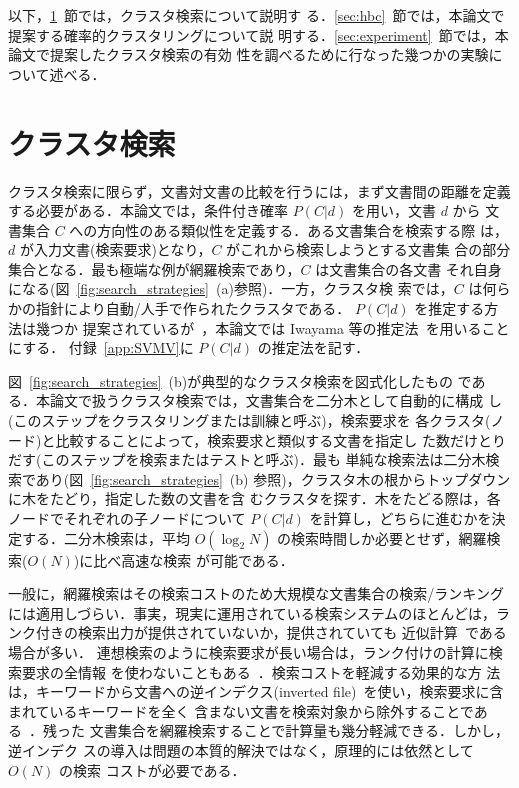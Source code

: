 以下，\ref{sec:cluster_based_search}~節では，クラスタ検索について説明す
る．\ref{sec:hbc}~節では，本論文で提案する確率的クラスタリングについて説
明する．\ref{sec:experiment}~節では，本論文で提案したクラスタ検索の有効
性を調べるために行なった幾つかの実験について述べる．

\section{クラスタ検索}
\label{sec:cluster_based_search}

クラスタ検索に限らず，文書対文書の比較を行うには，まず文書間の距離を定義
する必要がある．本論文では，条件付き確率 $P(C|d)$ を用い，文書 $d$ から
文書集合 $C$ への方向性のある類似性を定義する．ある文書集合を検索する際
は，$d$ が入力文書(検索要求)となり，$C$ がこれから検索しようとする文書集
合の部分集合となる．最も極端な例が網羅検索であり，$C$ は文書集合の各文書
それ自身になる(図~\ref{fig:search_strategies}~(a)参照)．一方，クラスタ検
索では，$C$ は何らかの指針により自動/人手で作られたクラスタである．
$P(C|d)$ を推定する方法は幾つか
提案されているが~\cite{robertson:76:a,fuhr:89:a,kwok:90:a}，本論文では 
Iwayama 等の推定法~\cite{iwayama:94:b}を用いることにする．
付録~\ref{app:SVMV}に $P(C|d)$ の推定法を記す．

図~\ref{fig:search_strategies}~(b)が典型的なクラスタ検索を図式化したもの
である．本論文で扱うクラスタ検索では，文書集合を二分木として自動的に構成
し(このステップを{\gt クラスタリング}または{\gt 訓練}と呼ぶ)，検索要求を
各クラスタ(ノード)と比較することによって，検索要求と類似する文書を指定し
た数だけとりだす(このステップを{\gt 検索}または{\gt テスト}と呼ぶ)．最も
単純な検索法は{\gt 二分木検索}であり(図~\ref{fig:search_strategies}~(b)
参照)，クラスタ木の根からトップダウンに木をたどり，指定した数の文書を含
むクラスタを探す．木をたどる際は，各ノードでそれぞれの子ノードについて 
$P(C|d)$ を計算し，どちらに進むかを決定する．二分木検索は，平均 
$O(\log_2 N)$ の検索時間しか必要とせず，網羅検索($O(N)$)に比べ高速な検索
が可能である．

一般に，網羅検索はその検索コストのため大規模な文書集合の検索/ランキング
には適用しづらい．事実，現実に運用されている検索システムのほとんどは，ラ
ンク付きの検索出力が提供されていないか，提供されていても
近似計算~\cite{cutting:97:a}である場合が多い．
連想検索のように検索要求が長い場合は，ランク付けの計算に検索要求の全情報
を使わないこともある~\cite{frakes:92:a}．検索コストを軽減する効果的な方
法は，キーワードから文書への逆インデクス(inverted
file)~\cite{salton:83:a}を使い，検索要求に含まれているキーワードを全く
含まない文書を検索対象から除外することである~\cite{perry:83:a}．残った
文書集合を網羅検索することで計算量も幾分軽減できる．しかし，逆インデク
スの導入は問題の本質的解決ではなく，原理的には依然として $O(N)$ の検索
コストが必要である．

